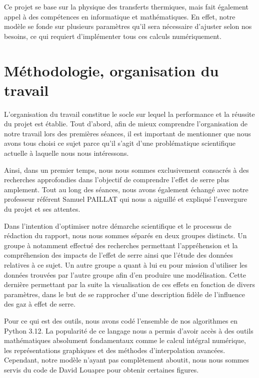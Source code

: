 \documentclass[a4paper, 12pt]{report} %
\begin{document}
\indent Ce projet se base sur la physique des transferts thermiques, 
mais fait également appel à des compétences en informatique et mathématiques.
En effet, notre modèle se fonde sur plusieurs paramètres qu'il sera nécessaire
d'ajuster selon nos besoins, ce qui requiert d'implémenter tous ces calculs
numériquement. \vspace{\baselineskip}


\chapter{Méthodologie, organisation du travail}


\indent L'organisation du travail constitue le socle sur lequel la performance et la réussite du projet est établie. Tout d’abord, afin de mieux comprendre l’organisation de notre travail lors des premières séances, il est important de mentionner que nous avons tous choisi ce sujet parce qu’il s’agit d’une problématique scientifique actuelle à laquelle nous nous intéressons. \vspace{\baselineskip}

\indent Ainsi, dans un premier temps, nous nous sommes exclusivement consacrés à des recherches approfondies dans l’objectif de comprendre l’effet de serre plus amplement. Tout au long des séances, nous avons également échangé avec notre professeur référent Samuel PAILLAT qui nous a aiguillé et expliqué l’envergure du projet et ses attentes.\vspace{\baselineskip}

Dans l’intention d'optimiser notre démarche scientifique et le processus de rédaction du rapport, nous nous sommes séparés en deux groupes distincts. Un groupe à notamment effectué des recherches permettant l'appréhension et la compréhension des impacts de l'effet de serre ainsi que l'étude des données relatives à ce sujet. Un autre groupe a quant à lui eu pour mission d'utiliser les données trouvées par l'autre groupe afin d'en produire une modélisation. Cette dernière permettant par la suite la visualisation de ces effets en fonction de divers paramètres, dans le but de se rapprocher d'une description fidèle de l'influence des gaz à effet de serre.\vspace{\baselineskip}

\indent Pour ce qui est des outils, nous avons codé l'ensemble de nos algorithmes en Python 3.12. La popularité de ce langage nous a
permis d'avoir accès à des outils mathématiques absolument fondamentaux comme le calcul intégral numérique, les représentations graphiques et des méthodes d'interpolation avancées. 
Cependant, notre modèle n'ayant pas complètement aboutit, nous nous sommes servis du code de David Louapre  pour obtenir certaines figures. \vspace{\baselineskip}
\end{document}
